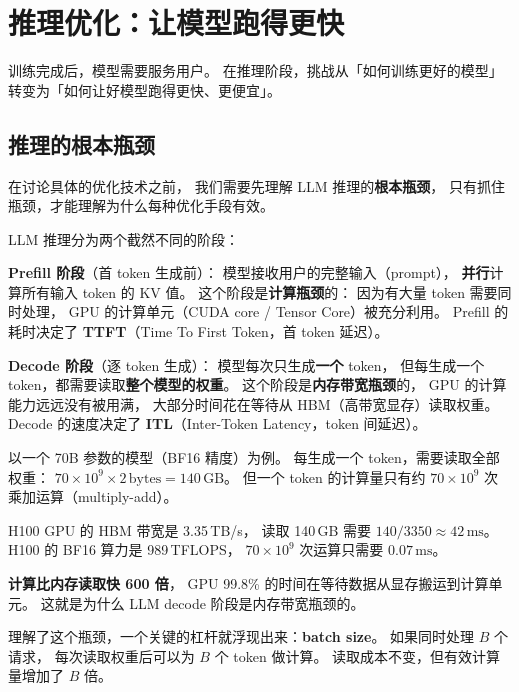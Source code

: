 \chapter{推理优化：让模型跑得更快}
\label{ch:inference}

训练完成后，模型需要服务用户。
在推理阶段，挑战从「如何训练更好的模型」
转变为「如何让好模型跑得更快、更便宜」。

\section{推理的根本瓶颈}

在讨论具体的优化技术之前，
我们需要先理解 LLM 推理的\textbf{根本瓶颈}，
只有抓住瓶颈，才能理解为什么每种优化手段有效。

LLM 推理分为两个截然不同的阶段：

\textbf{Prefill 阶段}（首 token 生成前）：
模型接收用户的完整输入（prompt），
\textbf{并行}计算所有输入 token 的 KV 值。
这个阶段是\textbf{计算瓶颈}的：
因为有大量 token 需要同时处理，
GPU 的计算单元（CUDA core / Tensor Core）被充分利用。
Prefill 的耗时决定了 \textbf{TTFT}（Time To First Token，首 token 延迟）。

\textbf{Decode 阶段}（逐 token 生成）：
模型每次只生成\textbf{一个} token，
但每生成一个 token，都需要读取\textbf{整个模型的权重}。
这个阶段是\textbf{内存带宽瓶颈}的，
GPU 的计算能力远远没有被用满，
大部分时间花在等待从 HBM（高带宽显存）读取权重。
Decode 的速度决定了 \textbf{ITL}（Inter-Token Latency，token 间延迟）。

\begin{whybox}
以一个 70B 参数的模型（BF16 精度）为例。
每生成一个 token，需要读取全部权重：
$70 \times 10^9 \times 2\,\text{bytes} = 140\,\text{GB}$。
但一个 token 的计算量只有约 $70 \times 10^9$ 次乘加运算（multiply-add）。

H100 GPU 的 HBM 带宽是 3.35\,TB/s，
读取 140\,GB 需要 $140 / 3350 \approx 42\,\text{ms}$。
H100 的 BF16 算力是 989\,TFLOPS，
$70 \times 10^9$ 次运算只需要 $0.07\,\text{ms}$。

\textbf{计算比内存读取快 600 倍}，
GPU 99.8\% 的时间在等待数据从显存搬运到计算单元。
这就是为什么 LLM decode 阶段是内存带宽瓶颈的。
\end{whybox}

理解了这个瓶颈，一个关键的杠杆就浮现出来：\textbf{batch size}。
如果同时处理 $B$ 个请求，
每次读取权重后可以为 $B$ 个 token 做计算。
读取成本不变，但有效计算量增加了 $B$ 倍。

